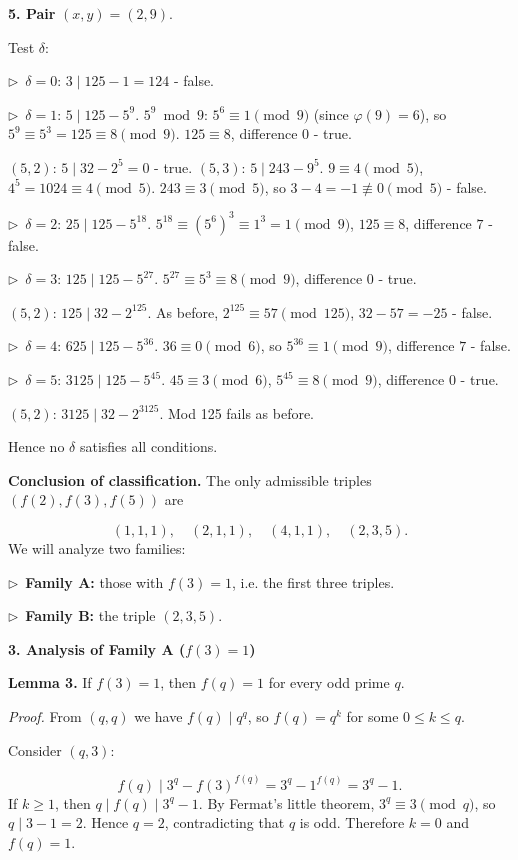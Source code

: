 \documentclass{llmxive}
\providecommand{\solutionheading}[1]{\par\smallskip\noindent\textbf{#1}\par}
\providecommand{\compactbullet}[1]{\par\noindent$\triangleright$~#1\par}
\begin{document}
\smallskip
\textbf{5. Pair }\((x,y)=(2,9)\).\textbf{}\par
Test \(\delta\):\par
\compactbullet{\(\delta=0\): \(3\mid125-1=124\) - false.}
\compactbullet{\(\delta=1\): \(5\mid125-5^{9}\). \(5^{9}\bmod9\): \(5^{6}\equiv1\pmod9\) (since \(\varphi(9)=6\)), so \(5^{9}\equiv5^{3}=125\equiv8\pmod9\). \(125\equiv8\), difference \(0\) - true.}
\((5,2)\): \(5\mid32-2^{5}=0\) - true. \((5,3)\): \(5\mid243-9^{5}\). \(9\equiv4\pmod5\), \(4^{5}=1024\equiv4\pmod5\). \(243\equiv3\pmod5\), so \(3-4=-1\not\equiv0\pmod5\) - false.\par
\compactbullet{\(\delta=2\): \(25\mid125-5^{18}\). \(5^{18}\equiv(5^{6})^{3}\equiv1^{3}=1\pmod9\), \(125\equiv8\), difference \(7\) - false.}
\compactbullet{\(\delta=3\): \(125\mid125-5^{27}\). \(5^{27}\equiv5^{3}\equiv8\pmod9\), difference \(0\) - true.}
\((5,2)\): \(125\mid32-2^{125}\). As before, \(2^{125}\equiv57\pmod{125}\), \(32-57=-25\) - false.\par
\compactbullet{\(\delta=4\): \(625\mid125-5^{36}\). \(36\equiv0\pmod6\), so \(5^{36}\equiv1\pmod9\), difference \(7\) - false.}
\compactbullet{\(\delta=5\): \(3125\mid125-5^{45}\). \(45\equiv3\pmod6\), \(5^{45}\equiv8\pmod9\), difference \(0\) - true.}
\((5,2)\): \(3125\mid32-2^{3125}\). Mod 125 fails as before.\par
Hence no \(\delta\) satisfies all conditions.\par
\smallskip
\textbf{Conclusion of classification.} The only admissible triples \((f(2),f(3),f(5))\) are\par
\[
(1,1,1),\quad (2,1,1),\quad (4,1,1),\quad (2,3,5).
\]
We will analyze two families:\par
\compactbullet{\textbf{Family A:} those with \(f(3)=1\), i.e. the first three triples.}
\compactbullet{\textbf{Family B:} the triple \((2,3,5)\).}
\smallskip
\solutionheading{3. Analysis of Family A (\(f(3)=1\))}
\textbf{Lemma 3.} If \(f(3)=1\), then \(f(q)=1\) for every odd prime \(q\).\par
\emph{Proof.} From \((q,q)\) we have \(f(q)\mid q^{q}\), so \(f(q)=q^{k}\) for some \(0\le k\le q\).\par
Consider \((q,3)\):\par
\[
f(q)\mid 3^{q}-f(3)^{f(q)}=3^{q}-1^{f(q)}=3^{q}-1.
\]
If \(k\ge1\), then \(q\mid f(q)\mid 3^{q}-1\). By Fermat's little theorem, \(3^{q}\equiv3\pmod q\), so \(q\mid 3-1=2\). Hence \(q=2\), contradicting that \(q\) is odd. Therefore \(k=0\) and \(f(q)=1\).\par
\end{document}
